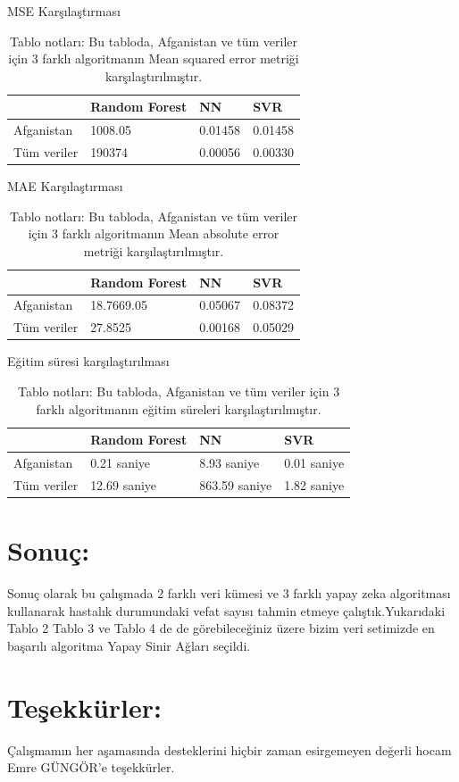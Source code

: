 \documentclass[12pt, a4paper]{article}
\begin{document}
	\begin{table}[h!]
		\centering
		\caption{MSE Karşılaştırması}
		\label{tab:performance_comparison}
		\begin{tabular}{llll}
			\hline
			& Random Forest & NN & SVR\\ \hline
			Afganistan & 1008.05 & 0.01458 &0.01458 \\
			Tüm veriler & 190374 & 0.00056 & 0.00330  \\ 
			\hline
		\end{tabular}
		\caption*{Tablo notları: Bu tabloda, Afganistan ve tüm veriler için 3 farklı algoritmanın Mean squared error metriği karşılaştırılmıştır.}
	\end{table}
	
	\begin{table}[h!]
		\centering
		\caption{MAE Karşılaştırması}
		\label{tab:performance_comparison}
		\begin{tabular}{llll}
			\hline
			& Random Forest & NN & SVR\\ \hline
			Afganistan & 18.7669.05 & 0.05067 &0.08372 \\
			Tüm veriler & 27.8525 & 0.00168 & 0.05029  \\ 
			\hline
		\end{tabular}
		\caption*{Tablo notları: Bu tabloda, Afganistan ve tüm veriler için 3 farklı algoritmanın Mean absolute error metriği karşılaştırılmıştır.}
	\end{table}
	
	\begin{table}[h!]
		\centering
		\caption{Eğitim süresi karşılaştırılması}
		\label{tab:performance_comparison}
		\begin{tabular}{llll}
			\hline
			& Random Forest & NN & SVR\\ \hline
			Afganistan & 0.21 saniye & 8.93 saniye & 0.01 saniye \\
			Tüm veriler & 12.69 saniye &863.59 saniye & 1.82 saniye  \\ 
			\hline
		\end{tabular}
		\caption*{Tablo notları: Bu tabloda, Afganistan ve tüm veriler için 3 farklı algoritmanın eğitim süreleri karşılaştırılmıştır.}
	\end{table}
	\section{Sonuç:}Sonuç olarak bu çalışmada 2 farklı veri kümesi ve 3 farklı yapay zeka algoritması kullanarak hastalık durumundaki vefat sayısı tahmin etmeye çalıştık.Yukarıdaki Tablo 2 Tablo 3 ve Tablo 4 de de görebileceğiniz üzere bizim veri setimizde en başarılı algoritma Yapay Sinir Ağları seçildi. 
	\section{Teşekkürler:}Çalışmamın her aşamasında desteklerini hiçbir zaman esirgemeyen değerli hocam Emre GÜNGÖR'e teşekkürler.
	\newpage
	
	
	
	
	
	
	
	
\end{document}
